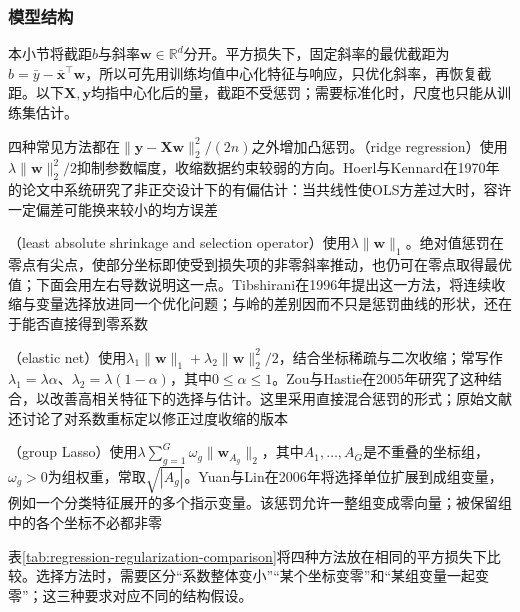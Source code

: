 \subsubsection{模型结构}
\label{sec:regression-penalties}

本小节将截距$b$与斜率$\bm{w}\in\mathbb{R}^d$分开。平方损失下，固定斜率的最优截距为$b=\bar y-\bar{\bm{x}}^{\top}\bm{w}$，所以可先用训练均值中心化特征与响应，只优化斜率，再恢复截距。以下$\bm{X},\bm{y}$均指中心化后的量，截距不受惩罚；需要标准化时，尺度也只能从训练集估计。

四种常见方法都在$\lVert\bm{y}-\bm{X}\bm{w}\rVert_2^2/(2n)$之外增加凸惩罚。（ridge regression）使用$\lambda\lVert\bm{w}\rVert_2^2/2$抑制参数幅度，收缩数据约束较弱的方向。Hoerl与Kennard在1970年的论文中系统研究了非正交设计下的有偏估计：当共线性使OLS方差过大时，容许一定偏差可能换来较小的均方误差

（least absolute shrinkage and selection operator）使用$\lambda\lVert\bm{w}\rVert_1$。绝对值惩罚在零点有尖点，使部分坐标即使受到损失项的非零斜率推动，也仍可在零点取得最优值；下面会用左右导数说明这一点。Tibshirani在1996年提出这一方法，将连续收缩与变量选择放进同一个优化问题；与岭的差别因而不只是惩罚曲线的形状，还在于能否直接得到零系数

（elastic net）使用$\lambda_1\lVert\bm{w}\rVert_1+\lambda_2\lVert\bm{w}\rVert_2^2/2$，结合坐标稀疏与二次收缩；常写作$\lambda_1=\lambda\alpha$、$\lambda_2=\lambda(1-\alpha)$，其中$0\leq\alpha\leq1$。Zou与Hastie在2005年研究了这种结合，以改善高相关特征下的选择与估计。这里采用直接混合惩罚的形式；原始文献还讨论了对系数重标定以修正过度收缩的版本

（group Lasso）使用$\lambda\sum_{g=1}^{G}\omega_g\lVert\bm{w}_{A_g}\rVert_2$，其中$A_1,\ldots,A_G$是不重叠的坐标组，$\omega_g>0$为组权重，常取$\sqrt{|A_g|}$。Yuan与Lin在2006年将选择单位扩展到成组变量，例如一个分类特征展开的多个指示变量。该惩罚允许一整组变成零向量；被保留组中的各个坐标不必都非零

表\ref{tab:regression-regularization-comparison}将四种方法放在相同的平方损失下比较。选择方法时，需要区分“系数整体变小”“某个坐标变零”和“某组变量一起变零”；这三种要求对应不同的结构假设。

